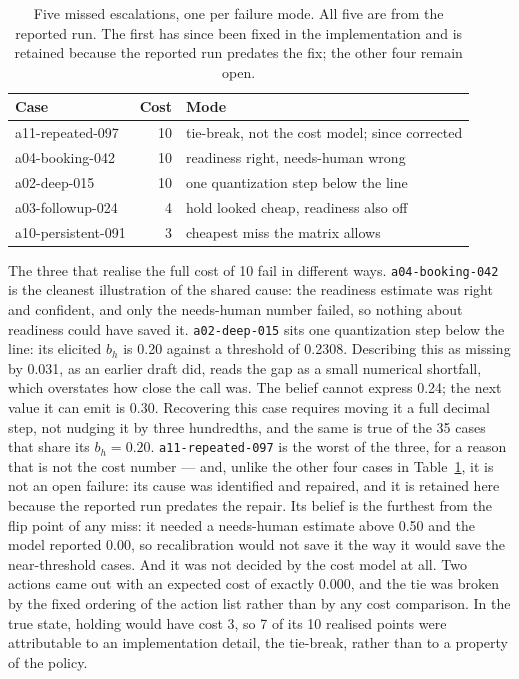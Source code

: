 \documentclass{article}
\begin{document}
\begin{table}[t]
\centering
\begin{tabular}{lr p{3.2cm}}
\toprule
Case & Cost & Mode \\
\midrule
a11-repeated-097 & 10 & tie-break, not the cost model; since corrected \\
a04-booking-042 & 10 & readiness right, needs-human wrong \\
a02-deep-015 & 10 & one quantization step below the line \\
a03-followup-024 & 4 & hold looked cheap, readiness also off \\
a10-persistent-091 & 3 & cheapest miss the matrix allows \\
\bottomrule
\end{tabular}
\caption{Five missed escalations, one per failure mode. All five are from the
reported run. The first has since been fixed in the implementation and is retained
because the reported run predates the fix; the other four remain open.}
\label{tab:failures}
\end{table}

The three that realise the full cost of 10 fail in different ways.
\texttt{a04-booking-042} is the cleanest illustration of the shared cause: the
readiness estimate was right and confident, and only the needs-human number
failed, so nothing about readiness could have saved it. \texttt{a02-deep-015} sits
one quantization step below the line: its elicited $b_h$ is 0.20 against a threshold
of 0.2308. Describing this as missing by 0.031, as an earlier draft did, reads the
gap as a small numerical shortfall, which overstates how close the call was. The
belief cannot express 0.24; the next value it can emit is 0.30. Recovering this case
requires moving it a full decimal step, not nudging it by three hundredths, and the
same is true of the 35 cases that share its $b_h = 0.20$. \texttt{a11-repeated-097}
is the worst of the three, for a reason that is not the cost number --- and, unlike
the other four cases in Table~\ref{tab:failures}, it is not an open failure: its
cause was identified and repaired, and it is retained here because the reported run
predates the repair. Its belief is the furthest from the flip point of any miss: it
needed a needs-human estimate above 0.50 and the model reported 0.00, so
recalibration would not save it the way it would save the near-threshold cases. And
it was not decided by the cost model at all. Two actions came out with an expected
cost of exactly 0.000, and the tie was broken by the fixed ordering of the action
list rather than by any cost comparison. In the true state, holding would have cost
3, so 7 of its 10 realised points were attributable to an implementation detail, the
tie-break, rather than to a property of the policy.
\end{document}
